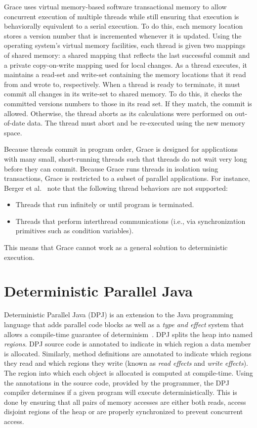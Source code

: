 Grace uses virtual memory-based software transactional memory to allow
concurrent execution of multiple threads while still ensuring that
execution is behaviorally equivalent to a serial execution.  To do
this, each memory location stores a version number that is incremented
whenever it is updated.  Using the operating system's virtual memory
facilities, each thread is given two mappings of shared memory: a
shared mapping that reflects the last successful commit and a private
copy-on-write mapping used for local changes.  As a thread executes,
it maintains a read-set and write-set containing the memory locations
that it read from and wrote to, respectively.  When a thread is ready
to terminate, it must commit all changes in its write-set to shared
memory.  To do this, it checks the committed versions numbers to those
in its read set.  If they match, the commit is allowed.  Otherwise,
the thread aborts as its calculations were performed on out-of-date
data.  The thread must abort and be re-executed using the new memory
space.

Because threads commit in program order, Grace is designed for
applications with many small, short-running threads such that threads
do not wait very long before they can commit. Because Grace runs
threads in isolation using transactions, Grace is restricted to a
subset of parallel applications.  For instance, Berger et
al.~\cite{grace} note that the following thread behaviors are not
supported:

\begin{itemize}
\item Threads that run infinitely or until program is terminated.

\item Threads that perform interthread communications (i.e., via
  synchronization primitives such as condition variables).
\end{itemize}

This means that Grace cannot work as a general solution to
deterministic execution.

\section{Deterministic Parallel Java}

Deterministic Parallel Java (DPJ) is an extension to the Java
programming language that adds parallel code blocks as well as a
\emph{type and effect} system that allows a compile-time guarantee of
determinism~\cite{dpj}.  DPJ splits the heap into named
\emph{regions}.  DPJ source code is annotated to indicate in which
region a data member is allocated.  Similarly, method definitions are
annotated to indicate which regions they read and which regions they
write (known as \emph{read effects} and \emph{write effects}).  The
region into which each object is allocated is computed at
compile-time.  Using the annotations in the source code, provided by
the programmer, the DPJ compiler determines if a given program will
execute deterministically.  This is done by ensuring that all pairs of
memory accesses are either both reads, access disjoint regions of the
heap or are properly synchronized to prevent concurrent access.

